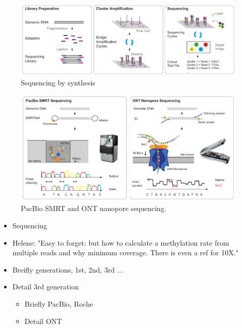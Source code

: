 \begin{figure}[h]
	\centering
	\includegraphics[width=1.0\textwidth]{figures/intro/sbs.pdf}
	\captionsetup{format=plain}
	\caption[Sequencing by synthesis]{Sequencing by synthesis}
	\label{fig:intro:sbs}
\end{figure}

\begin{figure}[h]
	\centering
	\includegraphics[width=1.0\textwidth]{figures/intro/long_read.pdf}
	\captionsetup{format=plain}
	\caption[Long read sequencing]{PacBio SMRT and ONT nanopore sequencing.}
	\label{fig:intro:longread}
\end{figure}

\begin{itemize}
    \item Sequencing
    \item Helene: "Easy to forget: but how to calculate a methylation rate from multiple reads and why minimum coverage. There is even a ref for 10X."
    \item Breifly generations, 1st, 2nd, 3rd ...
    \item Detail 3rd generation
    \begin{itemize}
        \item Briefly PacBio, Roche
        \item Detail ONT
    \end{itemize}
\end{itemize}

